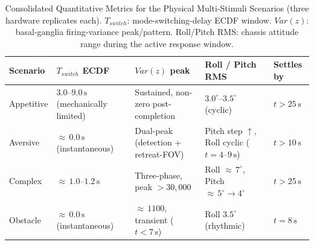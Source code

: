 
\begin{table}[htbp]
\centering
\caption{Consolidated Quantitative Metrics for the Physical Multi-Stimuli Scenarios (three hardware replicates each). $T_{switch}$: mode-switching-delay ECDF window. $Var(z)$: basal-ganglia firing-variance peak/pattern. Roll/Pitch RMS: chassis attitude range during the active response window.}
\label{tab:consolidated_physical_metrics}
\begin{tabularx}{\textwidth}{l >{\centering\arraybackslash}X >{\centering\arraybackslash}X >{\centering\arraybackslash}X >{\centering\arraybackslash}X}
\toprule
\textbf{Scenario} & \textbf{$T_{switch}$ ECDF} & \textbf{$Var(z)$ peak} & \textbf{Roll / Pitch RMS} & \textbf{Settles by} \\
\midrule
Appetitive & $3.0$--$9.0\,\text{s}$ (mechanically limited) & Sustained, non-zero post-completion & $3.0^{\circ}$--$3.5^{\circ}$ (cyclic) & $t > 25\,\text{s}$ \\
Aversive   & ${\approx}\,0.0\,\text{s}$ (instantaneous) & Dual-peak (detection + retreat-FOV) & Pitch step $\uparrow$, Roll cyclic ($t{=}4$--$9\,\text{s}$) & $t > 10\,\text{s}$ \\
Complex    & ${\approx}\,1.0$--$1.2\,\text{s}$ & Three-phase, peak $>30{,}000$ & Roll ${\approx}\,7^{\circ}$, Pitch ${\approx}\,5^{\circ} \to 4^{\circ}$ & $t > 25\,\text{s}$ \\
Obstacle   & ${\approx}\,0.0\,\text{s}$ (instantaneous) & ${\approx}\,1100$, transient ($t < 7\,\text{s}$) & Roll $3.5^{\circ}$ (rhythmic) & $t = 8\,\text{s}$ \\
\bottomrule
\end{tabularx}
\end{table}
